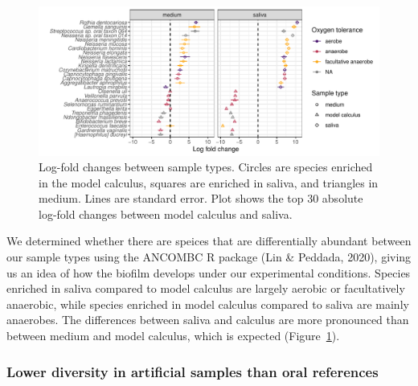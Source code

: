 \documentclass[
]{article}
\begin{document}
\begin{figure}

{\centering \includegraphics{index_files/figure-pdf/fig-diffabund-byoc-1.pdf}

}

\caption{\label{fig-diffabund-byoc}Log-fold changes between sample
types. Circles are species enriched in the model calculus, squares are
enriched in saliva, and triangles in medium. Lines are standard error.
Plot shows the top 30 absolute log-fold changes between model calculus
and saliva.}

\end{figure}

We determined whether there are speices that are differentially abundant
between our sample types using the ANCOMBC R package (Lin \& Peddada,
2020), giving us an idea of how the biofilm develops under our
experimental conditions. Species enriched in saliva compared to model
calculus are largely aerobic or facultatively anaerobic, while species
enriched in model calculus compared to saliva are mainly anaerobes. The
differences between saliva and calculus are more pronounced than between
medium and model calculus, which is expected
(Figure~\ref{fig-diffabund-byoc}).

\hypertarget{lower-diversity-in-artificial-samples-than-oral-references}{%
\subsubsection{Lower diversity in artificial samples than oral
references}\label{lower-diversity-in-artificial-samples-than-oral-references}}
\end{document}
